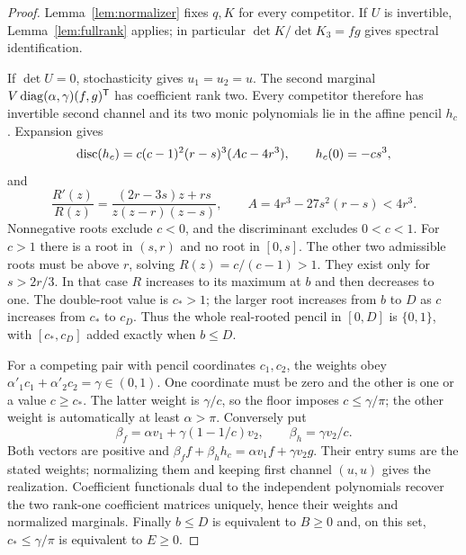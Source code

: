 \begin{proof}
Lemma~\ref{lem:normalizer} fixes $q,K$ for every competitor. If $U$ is
invertible, Lemma~\ref{lem:fullrank} applies; in particular
$\det K/\det K_3=fg$ gives spectral identification.

If $\det U=0$, stochasticity gives $u_1=u_2=u$. The second marginal
$V\operatorname{diag}(\alpha,\gamma)(f,g)^{\mathsf T}$ has coefficient rank two.
Every competitor therefore has invertible second channel and its two
monic polynomials lie in the affine pencil $h_c$. Expansion gives
\begin{equation}\label{eq:disc}
 \operatorname{disc}(h_c)=c(c-1)^2(r-s)^3(Ac-4r^3),\qquad h_c(0)=-cs^3,
\end{equation}
and
\[
 \frac{R'(z)}{R(z)}=\frac{(2r-3s)z+rs}{z(z-r)(z-s)},\qquad
 A=4r^3-27s^2(r-s)<4r^3.
\]
Nonnegative roots exclude $c<0$, and the discriminant excludes $0<c<1$.
For $c>1$ there is a root in $(s,r)$ and no root in $[0,s]$. The other
two admissible roots must be above $r$, solving $R(z)=c/(c-1)>1$.
They exist only for $s>2r/3$. In that case $R$ increases to its maximum
at $b$ and then decreases to one. The double-root value is $c_*>1$;
the larger root increases from $b$ to $D$ as $c$ increases from $c_*$
to $c_D$. Thus the whole real-rooted pencil in $[0,D]$ is $\{0,1\}$,
with $[c_*,c_D]$ added exactly when $b\le D$.

For a competing pair with pencil coordinates $c_1,c_2$, the weights obey
$\alpha'_1c_1+\alpha'_2c_2=\gamma\in(0,1)$. One coordinate must be
zero and the other is one or a value $c\ge c_*$. The latter weight is
$\gamma/c$, so the floor imposes $c\le\gamma/\pi$; the other weight
is automatically at least $\alpha>\pi$. Conversely put
\[
 \beta_f=\alpha v_1+\gamma(1-1/c)v_2,\qquad
 \beta_h=\gamma v_2/c.
\]
Both vectors are positive and
$\beta_ff+\beta_hh_c=\alpha v_1f+\gamma v_2g$.
Their entry sums are the stated weights; normalizing them and keeping
first channel $(u,u)$ gives the realization. Coefficient functionals
dual to the independent polynomials recover the two rank-one coefficient
matrices uniquely, hence their weights and normalized marginals.
Finally $b\le D$ is equivalent to $B\ge0$ and, on this set,
$c_*\le\gamma/\pi$ is equivalent to $E\ge0$.
\end{proof}


